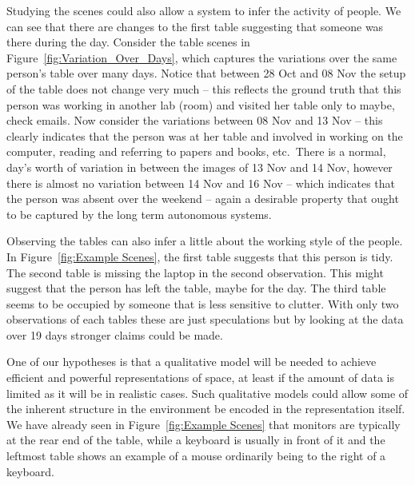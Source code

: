 \documentclass[letterpaper, 10 pt, conference]{ieeeconf}  %
\begin{document}
Studying the scenes could also allow a system to 
infer the activity of people. We can see that there are changes to the first table 
suggesting that someone was there during the day. Consider the table scenes in 
Figure~\ref{fig:Variation_Over_Days}, which captures the variations over the same person's
table over many days. Notice that between 28 Oct and 08 Nov the setup of the table does 
not change very much -- this reflects the ground truth that this person was working in 
another lab (room) and visited her table only to maybe, check emails. Now 
consider the variations between 08 Nov and 13 Nov -- this clearly indicates 
that the person was at her table and involved in working on the computer, 
reading and referring to papers and books, etc.\ There is a normal, day's 
worth of variation in between the images of 13 Nov and 14 Nov, however there 
is almost no variation between 14 Nov and 16 Nov -- which indicates that the 
person was absent over the weekend -- again a desirable property that ought 
to be captured by the long term autonomous systems.

Observing the tables can also infer a little about the working style of the 
people. In Figure~\ref{fig:Example Scenes}, the first table suggests that 
this person is tidy. The second table is missing the laptop in the second 
observation. This might suggest that 
the person has left the table, maybe for the day. The third table seems to 
be occupied by someone that is less sensitive to 
clutter. With only two observations of each tables these are just 
speculations but by looking at the data over 19 days stronger claims could be made.

One of our hypotheses is that a qualitative model will be needed to achieve 
efficient and powerful representations of 
space, at least if the amount of data is limited as it will be in realistic 
cases. Such qualitative models could allow some of the inherent 
structure in the environment be encoded in the representation itself. We 
have already seen in Figure~\ref{fig:Example Scenes} that monitors 
are typically at the rear end of the table, while a keyboard is usually in front of it and the 
leftmost table shows an example of a mouse ordinarily being to the right of a keyboard. 
\end{document}
